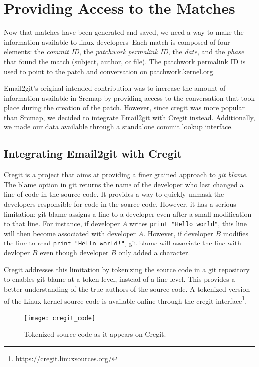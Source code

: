\section{Providing Access to the Matches} 

Now that matches have been generated and saved, we need a way to make the information available to linux developers. Each match is composed of four elements: the \textit{commit ID}, the \textit{patchwork permalink ID}, the \textit{date}, and the \textit{phase} that found the match (subject, author, or file). The patchwork permalink ID is used to point to the patch and conversation on patchwork.kernel.org.

Email2git's original intended contribution was to increase the amount of information available in Srcmap by providing access to the conversation that took place during the creation of the patch. However, since cregit was more popular than Srcmap, we decided to integrate Email2git with Cregit instead. Additionally, we made our data available through a standalone commit lookup interface.

\subsection{Integrating Email2git with Cregit}

Cregit is a project that aims at providing a finer grained approach to \textit{git blame}. The blame option in git returns the name of the developer who last changed a line of code in the source code. It provides a way to quickly unmask the developers responsible for code in the source code. However, it has a serious limitation: git blame assigns a line to a developer even after a small modification to that line. For instance, if developer $A$ writes \texttt{print "Hello world"}, this line will then become associated with developer $A$. However, if developer $B$ modifies the line to read \texttt{print "Hello world!"}, git blame will associate the line with devloper $B$ even though developer $B$ only added a character. 

Cregit addresses this limitation by tokenizing the source code in a git repository to enables git blame at a token level, instead of a line level. This provides a better understanding of the true authors of the source code. A tokenized version of the Linux kernel source code is available online through the cregit interface\footnote{\url{https://cregit.linuxsources.org/}}.

\begin{figure}[htb]
\centering
\texttt{[image: cregit\_code]}
\caption{Tokenized source code as it appears on Cregit.}
\label{fig:cregit_code}
\end{figure}

